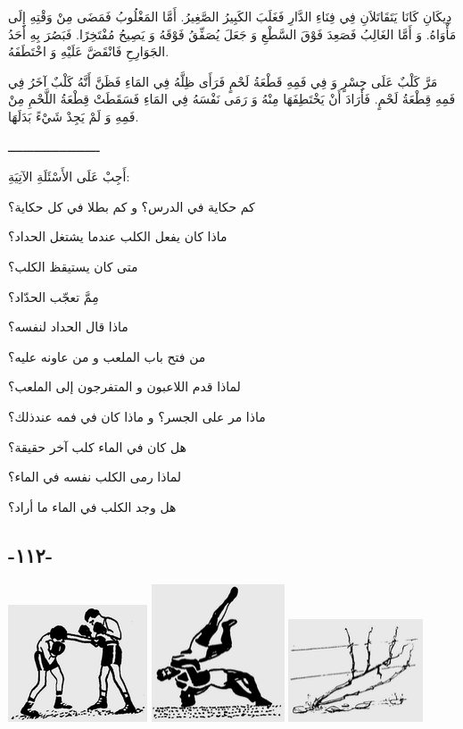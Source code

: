 \documentclass[a5paper]{article}
\begin{document}
دِيكَانِ كَانَا يَتَقَاتَلاَنِ فِي فِنَاءِ الدَّارِ فَغَلَبَ الكَبِيرُ الصَّغِيرُ. أَمَّا المَغْلُوبُ فَمَضَى مِنْ وَقْتِهِ إِلَى مَأْوَاهُ. وَ أَمَّا الغَالِبُ فَصَعِدَ فَوْقَ السَّطْعِ وَ جَعَلَ يُصَفِّقُ فَوْقَهُ وَ يَصِيحُ مُفْتَخِرًا. فَبَصُرَ بِهِ أَحَدُ الجَوَارِحِ فَانْقَضَّ عَلَيْهِ وَ اخْتَطَفَهُ. 

مَرَّ كَلْبٌ عَلَى جِسْرٍ وَ فِي فَمِهِ قَطْعَةُ لَحْمٍ فَرَأَى ظِلَّهُ فِي المَاءِ فَظَنَّ أَنَّهُ كَلْبٌ آخَرُ فِي فَمِهِ قِطْعَةُ لَحْمٍ. فَأَرَادَ أَنْ يَخْتَطِفَهَا مِنْهُ وَ رَمَى نَفْسَهُ فِي المَاءِ فَسَقَطَتْ قِطْعَةُ اللَّحْمِ مِنْ فَمِهِ وَ لَمْ يَجِدْ شَيْءً بَدَلَهَا.

ـــــــــــــــــــــــــ

أَجِبْ عَلَى الأَسْئَلَةِ الآتِيَةِ:

كم حكاية في الدرس؟ و كم بطلا في كل حكاية؟ 

ماذا كان يفعل الكلب عندما يشتغل الحداد؟

متى كان يستيقظ الكلب؟

مِمَّ تعجّب الحدّاد؟

ماذا قال الحداد لنفسه؟

من فتح باب الملعب و من عاونه عليه؟

لماذا قدم اللاعبون و المتفرجون إلى الملعب؟

ماذا مر على الجسر؟ و ماذا كان في فمه عندذلك؟ 

هل كان في الماء كلب آخر حقيقة؟

لماذا رمى الكلب نفسه في الماء؟

هل وجد الكلب في الماء ما أراد؟

\subsection{-١١٢-}
 \includegraphics[width=1.6252in,height=1.3646in]{MuhammadBagauddinlatinized-img289.png}   \includegraphics[width=1.552in,height=1.6146in]{MuhammadBagauddinlatinized-img290.png}   \includegraphics[width=1.5728in,height=1.2083in]{MuhammadBagauddinlatinized-img291.png} 
\end{document}

